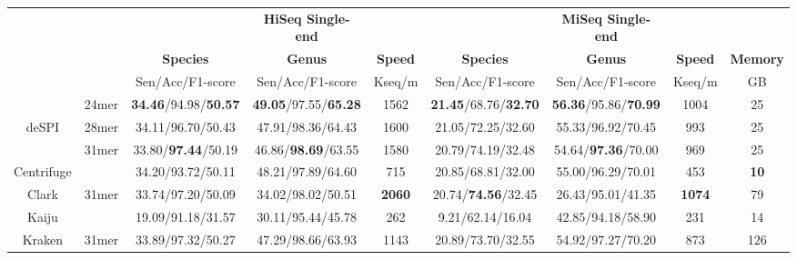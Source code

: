 \documentclass[a0,portrait, svgnames]{a0poster}
\begin{document}
\begin{multicols}{2}
\begin{center}\vspace{1cm}
\footnotesize
\begin{tabular}{ccccc|ccc|c}
\toprule
& & & \textbf{HiSeq Single-end} & && \textbf{MiSeq Single-end} & & \\
& & \textbf{Species} & \textbf{Genus} & \textbf{Speed} & \textbf{Species} & \textbf{Genus} & \textbf{Speed} & \textbf{Memory}\\
\cline{3-5}\cline{6-9}
& & Sen/Acc/F1-score & Sen/Acc/F1-score & Kseq/m &Sen/Acc/F1-score & Sen/Acc/F1-score & Kseq/m & GB\\
\midrule
& 24mer &\textbf{34.46}/94.98/\textbf{50.57} & \textbf{49.05}/97.55/\textbf{65.28} & 1562 & \textbf{21.45}/68.76/\textbf{32.70} & \textbf{56.36}/95.86/\textbf{70.99} & 1004 & 25 \\
deSPI & 28mer & 34.11/96.70/50.43 & 47.91/98.36/64.43 & 1600& 21.05/72.25/32.60 & 55.33/96.92/70.45 & 993& 25\\
 & 31mer & 33.80/\textbf{97.44}/50.19 & 46.86/\textbf{98.69}/63.55 & 1580 & 20.79/74.19/32.48 & 54.64/\textbf{97.36}/70.00 & 969 & 25\\
Centrifuge	 & & 34.20/93.72/50.11 & 48.21/97.89/64.60 & 715 &20.85/68.81/32.00 & 55.00/96.29/70.01 & 453 & \textbf{10}\\
Clark & 31mer & 33.74/97.20/50.09 & 34.02/98.02/50.51 & \textbf{2060} & 20.74/\textbf{74.56}/32.45 & 26.43/95.01/41.35 & \textbf{1074} & 79 \\
Kaiju	 & & 19.09/91.18/31.57 & 30.11/95.44/45.78 & 262 & 9.21/62.14/16.04 & 42.85/94.18/58.90 & 231 & 14\\
Kraken & 31mer & 33.89/97.32/50.27 & 47.29/98.66/63.93 & 1143 & 20.89/73.70/32.55 & 54.92/97.27/70.20 & 873 & 126\\
\bottomrule 
\end{tabular}
\end{center}\vspace{1cm}


\end{multicols}
\end{document}
